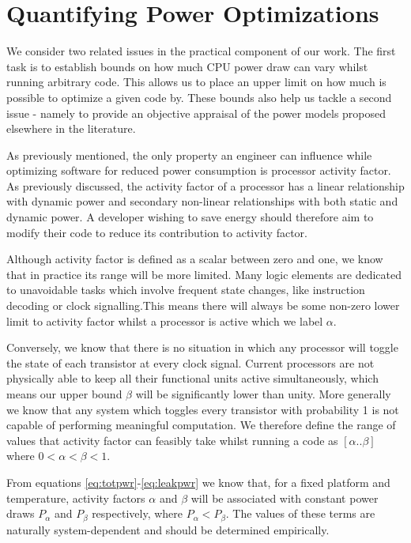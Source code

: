 \section{Quantifying Power Optimizations}
\label{sec:quantifying}

We consider two related issues in the practical component of our work. The first task is to establish bounds on how much CPU power draw can vary whilst running arbitrary code. This allows us to place an upper limit on how much is possible to optimize a given code by. These bounds also help us tackle a second issue - namely to provide an objective appraisal of the power models proposed elsewhere in the literature.

As previously mentioned, the only property an engineer can influence while optimizing software for reduced power consumption is processor activity factor. As previously discussed, the activity factor of a processor has a linear relationship with dynamic power and secondary non-linear relationships with both static and dynamic power. A developer wishing to save energy should therefore aim to modify their code to reduce its contribution to activity factor.

Although activity factor is defined as a scalar between zero and one, we know that in practice its range will be more limited.  Many logic elements are dedicated to unavoidable tasks which involve frequent state changes, like instruction decoding or clock signalling.This means there will always be some non-zero lower limit to activity factor whilst a processor is active which we label $\alpha$.

Conversely, we know that there is no situation in which any processor will toggle the state of each transistor at every clock signal. Current processors are not physically able to keep all their functional units active simultaneously, which means our upper bound $\beta$ will be significantly lower than unity. More generally we know that any system which toggles every transistor with probability 1 is not capable of performing meaningful computation. We therefore define the range of values that activity factor can feasibly take whilst running a code as $[\alpha  .. \beta]$ where $0 < \alpha < \beta < 1$.

From equations \ref{eq:totpwr}-\ref{eq:leakpwr} we know that, for a fixed platform and temperature, activity factors $\alpha$ and $\beta$ will be associated with constant power draws $P_{\alpha}$ and $P_{\beta}$ respectively, where $P_{\alpha} < P_{\beta}$. The values of these terms are naturally system-dependent and should be determined empirically. 

